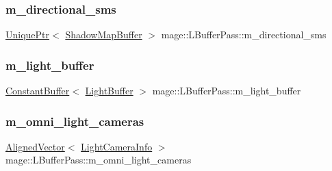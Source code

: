 \hypertarget{classmage_1_1_l_buffer_pass_ab1372d2fc5e0e716565f8d3d8eb6db97}{}\label{classmage_1_1_l_buffer_pass_ab1372d2fc5e0e716565f8d3d8eb6db97} 
\subsubsection{\texorpdfstring{m\+\_\+directional\+\_\+sms}{m\_directional\_sms}}
{\footnotesize\ttfamily \hyperlink{namespacemage_a3316d7143a973e37adf1110f2e80ca31}{Unique\+Ptr}$<$ \hyperlink{structmage_1_1_shadow_map_buffer}{Shadow\+Map\+Buffer} $>$ mage\+::\+L\+Buffer\+Pass\+::m\+\_\+directional\+\_\+sms\hspace{0.3cm}{\ttfamily [private]}}

\hypertarget{classmage_1_1_l_buffer_pass_a5946e3e691734567824644f8d1ec77b9}{}\label{classmage_1_1_l_buffer_pass_a5946e3e691734567824644f8d1ec77b9} 
\subsubsection{\texorpdfstring{m\+\_\+light\+\_\+buffer}{m\_light\_buffer}}
{\footnotesize\ttfamily \hyperlink{classmage_1_1_constant_buffer}{Constant\+Buffer}$<$ \hyperlink{structmage_1_1_light_buffer}{Light\+Buffer} $>$ mage\+::\+L\+Buffer\+Pass\+::m\+\_\+light\+\_\+buffer\hspace{0.3cm}{\ttfamily [private]}}

\hypertarget{classmage_1_1_l_buffer_pass_ae8474ced9c3b762ffba3f1d859b9396a}{}\label{classmage_1_1_l_buffer_pass_ae8474ced9c3b762ffba3f1d859b9396a} 
\subsubsection{\texorpdfstring{m\+\_\+omni\+\_\+light\+\_\+cameras}{m\_omni\_light\_cameras}}
{\footnotesize\ttfamily \hyperlink{namespacemage_a8664bfb5ce2179fc64eae9f82c8a5ba8}{Aligned\+Vector}$<$ \hyperlink{structmage_1_1_l_buffer_pass_1_1_light_camera_info}{Light\+Camera\+Info} $>$ mage\+::\+L\+Buffer\+Pass\+::m\+\_\+omni\+\_\+light\+\_\+cameras\hspace{0.3cm}{\ttfamily [private]}}

